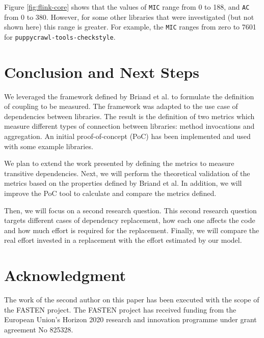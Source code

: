 \documentclass[a4paper]{article}
\begin{document}
Figure \ref{fig:flink-core} shows that the values of \texttt{MIC} range from 0 to 188, and \texttt{AC} from 0 to 380. However, for some other libraries that were investigated (but not shown here) this range is greater. For example, the \texttt{MIC} ranges from zero to 7601 for \texttt{puppycrawl-tools-checkstyle}.

\section{Conclusion and Next Steps}
We leveraged the framework defined by Briand et al. to formulate the definition of coupling to be measured. The framework was adapted to the use case of dependencies between libraries. The result is the definition of two metrics which measure different types of connection between libraries: method invocations and aggregation. An initial proof-of-concept (PoC) has been implemented and used with some example libraries.

We plan to extend the work presented by defining the metrics to measure transitive dependencies. Next, we will perform the theoretical validation of the metrics based on the properties defined by Briand et al. In addition, we will improve the PoC tool to calculate and compare the metrics defined.

Then, we will focus on a second research question. This second research question targets different cases of dependency replacement, how each one affects the code and how much effort is required for the replacement.
Finally, we will compare the real effort invested in a replacement with the effort estimated by our model.

\section{Acknowledgment}
The work of the second author on this paper has been executed with the scope of the FASTEN project. The FASTEN project has received funding from the European Union's Horizon 2020 research and innovation programme under grant agreement No 825328.



\end{document}
